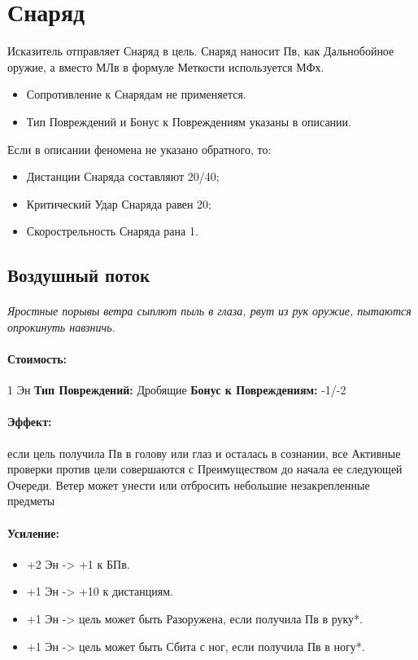 

\section{Снаряд}Исказитель отправляет Снаряд в цель. Снаряд наносит Пв, как Дальнобойное оружие, а вместо МЛв в формуле Меткости используется МФх.
\begin{itemize}
\item Сопротивление к Снарядам не применяется.
\item Тип Повреждений и Бонус к Повреждениям указаны в описании.
\end{itemize}Если в описании феномена не указано обратного, то:
\begin{itemize}
\item Дистанции Снаряда составляют 20/40;
\item Критический Удар Снаряда равен 20;
\item Скорострельность Снаряда рана 1.
\end{itemize}
\subsection{Воздушный поток}
\paragraph{} 
\textit{Яростные порывы ветра сыплют пыль в глаза, рвут из рук оружие, пытаются опрокинуть навзничь.}
\paragraph{Стоимость: }1 Эн
\newline
\textbf{Тип Повреждений: }Дробящие
\newline
\textbf{Бонус к Повреждениям: }-1/-2
\paragraph{Эффект: }если цель получила Пв в голову или глаз и осталась в сознании, все Активные проверки против цели совершаются с Преимуществом до начала ее следующей Очереди. 
\newline Ветер может унести или отбросить небольшие незакрепленные предметы
\paragraph{Усиление:}
\begin{itemize}
\item+2 Эн -> +1 к БПв.
\item+1 Эн -> +10 к дистанциям.
\item+1 Эн -> цель может быть Разоружена, если получила Пв в руку*.
\item+1 Эн -> цель может быть Сбита с ног, если получила Пв в ногу*.
\end{itemize}
